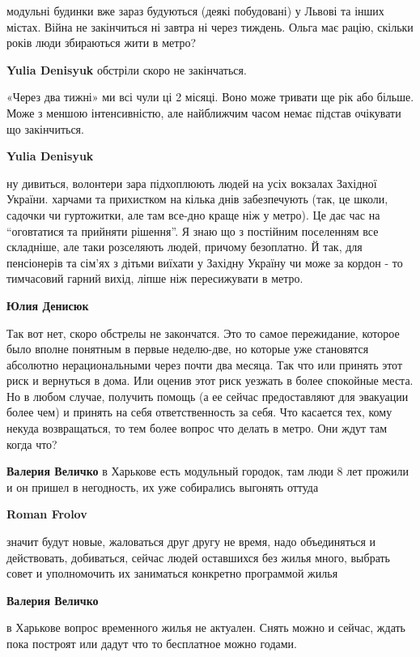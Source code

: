 \begin{itemize}
\begin{itemize}
модульні будинки вже зараз будуються (деякі побудовані) у Львові та інших
містах. Війна не закінчиться ні завтра ні через тиждень. Ольга має рацію,
скільки років люди збираються жити в метро?

\textbf{Yulia Denisyuk} обстріли скоро не закінчаться.

«Через два тижні» ми всі чули ці 2 місяці. Воно може тривати ще рік або більше.
Може з меншою інтенсивністю, але найближчим часом немає підстав очікувати що
закінчиться.

\textbf{Yulia Denisyuk} 

ну дивиться, волонтери зара підхоплюють людей на усіх вокзалах Західної
України. харчами та прихистком на кілька днів забезпечують (так, це школи,
садочки чи гуртожитки, але там все-дно краще ніж у метро). Це дає час на
\enquote{оговтатися та прийняти рішення}. Я знаю що з постійним поселенням все
складніше, але таки розселяють людей, причому безоплатно. Й так, для
пенсіонерів та сім’ях з дітьми виїхати у Західну Україну чи може за кордон -
то тимчасовий гарний вихід, ліпше ніж пересижувати в метро.

\textbf{Юлия Денисюк} 

Так вот нет, скоро обстрелы не закончатся. Это то самое пережидание, которое
было вполне понятным в первые неделю-две, но которые уже становятся абсолютно
нерациональными через почти два месяца. Так что или принять этот риск и
вернуться в дома. Или оценив этот риск уезжать в более спокойные места. Но в
любом случае, получить помощь (а ее сейчас предоставляют для эвакуации более
чем) и принять на себя ответственность за себя. Что касается тех, кому некуда
возвращаться, то тем более вопрос что делать в метро. Они ждут там когда что?

\textbf{Валерия Величко} в Харькове есть модульный городок, там люди 8 лет прожили и он пришел в негодность, их уже собирались выгонять оттуда

\textbf{Roman Frolov} 

значит будут новые, жаловаться друг другу не время, надо объединяться и
действовать, добиваться, сейчас людей оставшихся без жилья много, выбрать совет
и уполномочить их заниматься конкретно программой жилья

\textbf{Валерия Величко} 

в Харькове вопрос временного жилья не актуален. Снять можно и сейчас, ждать
пока построят или дадут что то бесплатное можно годами.


\end{itemize}
\end{itemize}
